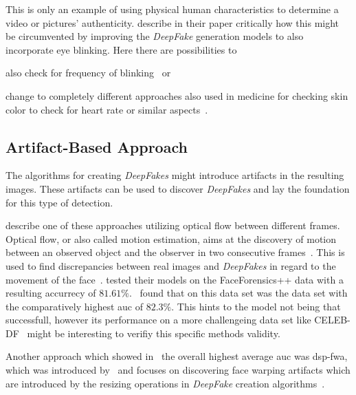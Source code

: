 \par
This is only an example of using physical human characteristics to determine a
video or pictures' authenticity. \textcite{li_ictu_2018} describe in 
their paper critically how this might be circumvented by improving the \textit{DeepFake}
generation models to also incorporate eye blinking. Here there are possibilities
to 
\begin{enumerate*}[a.)]
    \item also check for frequency of blinking~\cite{li_ictu_2018} or
    \item change to completely different approaches also used in medicine for
    checking skin color to check for heart rate or similar aspects~\cite{pishori_detecting_2020}.
\end{enumerate*}

\subsection{Artifact-Based Approach}
The algorithms for creating \textit{DeepFakes} might introduce artifacts in the resulting
images. These artifacts can be used to discover \textit{DeepFakes} and lay the foundation
for this type of detection.

\par
\textcite{amerini_deepfake_2019} describe one of these approaches utilizing optical
flow between different frames.
Optical flow, or also called motion estimation, aims at the discovery of motion
between an observed object and the observer in two consecutive frames~\cite{beauchemin_computation_1995}.
This is used to find discrepancies between real images and \textit{DeepFakes} in regard
to the movement of the face~\cite{amerini_deepfake_2019}.
\textcite{amerini_deepfake_2019} tested their models on the FaceForensics++ data
with a resulting accurrecy of \(81.61\%\).~\textcite{li_celeb-df_2019} found that
on this data set was the data set with the comparatively highest \gls{auc} of 
\(82.3\%\). This hints to the model not being that successfull, however its
performance on a more challengeing data set like CELEB-DF~\cite{li_celeb-df_2019}
might be interesting to verifiy this specific methods validity.

\par
Another approach which showed in~\cite{li_celeb-df_2019} the overall highest
average \gls{auc} was \gls{dsp-fwa}, which was introduced by~\cite{he_spatial_2014}
and focuses on discovering face warping artifacts which are introduced by the 
resizing operations in \textit{DeepFake} creation algorithms~\cite{li_celeb-df_2019,he_spatial_2014}.


